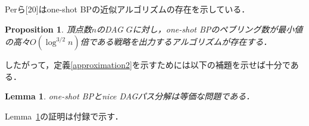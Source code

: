 \documentclass[master]{kuisthesis}		%
\theoremstyle{plain}
\newtheorem{proposition}{Proposition}
\newtheorem{lemma}{Lemma}
\theoremstyle{definition}
\begin{document}
Perら[20]はone-shot BPの近似アルゴリズムの存在を示している．

\begin{proposition}
    頂点数$n$のDAG $G$に対し，one-shot BPのペブリング数が最小値の高々$O(\log ^{3/2} n)$倍である戦略を出力するアルゴリズムが存在する．
\end{proposition}

したがって，定義\ref{approximation2}を示すためには以下の補題を示せば十分である．

\begin{lemma}\label{lemma_approximation2}
    one-shot BPとnice DAGパス分解は等価な問題である．
\end{lemma}

Lemma~\ref{lemma_approximation2}の証明は付録で示す．

\end{document}
